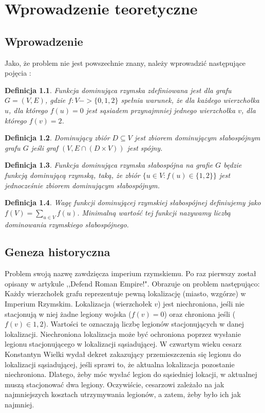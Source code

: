 \chapter{Wprowadzenie teoretyczne}

\section{Wprowadzenie}
Jako, że problem nie jest powszechnie znany, należy wprowadzić następujące pojęcia \cite{theoryWCRDF}:

\newtheorem{definition}{Definicja}

\begin{definition}
    Funkcja dominująca rzymska zdefiniowana jest dla grafu $G = (V, E)$, gdzie $f: V -> \{0,1,2\}$ spełnia warunek, że dla każdego wierzchołka $u$, dla którego $f(u) = 0$ jest sąsiadem przynajmniej jednego wierzchołka $v$, dla którego $f(v) = 2$.
\end{definition}

\begin{definition}
    Dominujący zbiór $D \subseteq V$ jest zbiorem dominującym słabospójnym grafu $G$ jeśli graf $(V,E \cap (D \times V))$ jest spójny.
\end{definition}

\begin{definition}
    Funkcja dominująca rzymska słabospójna na grafie $G$ będzie funkcją dominującą rzymską, taką, że zbiór $\{u \in V: f(u) \in \{1,2\}\}$ jest jednocześnie zbiorem dominującym słabospójnym.
\end{definition}

\begin{definition}
    Wagę funkcji dominującej rzymskiej słabospójnej definiujemy jako $f(V) = \sum_{u \in V}{f(u)}$. Minimalną wartość tej funkcji nazywamy liczbą dominowania rzymskiego słabospójnego. 
\end{definition}

\section{Geneza historyczna}
Problem swoją nazwę zawdzięcza imperium rzymskiemu. Po raz pierwszy został opisany w artykule ,,Defend Roman Empire!".
Obrazuje on problem następująco: Każdy wierzchołek grafu reprezentuje pewną lokalizację (miasto, wzgórze) w Imperium Rzymskim. Lokalizacja (wierzchołek $v$) jest niechroniona, jeśli nie stacjonują w niej żadne legiony wojska ($f(v) = 0$) oraz chroniona jeśli ($f(v) \in {1,2} $). Wartości te oznaczają liczbę legionów stacjonujących w danej lokalizacji. Niechroniona lokalizacja może być ochroniona poprzez wysłanie legionu stacjonującego w lokalizacji sąsiadującej. W czwartym wieku cesarz Konstantyn Wielki wydał dekret zakazujący przemieszczenia się legionu do lokalizacji sąsiadującej, jeśli sprawi to, że aktualna lokalizacja pozostanie niechroniona. Dlatego, żeby móc wysłać legion do sąsiedniej lokacji, w aktualnej muszą stacjonować dwa legiony. Oczywiście, cesarzowi zależało na jak najmniejszych kosztach utrzymywania legionów, a zatem, żeby było ich jak najmniej. \cite{theoryWCRDF}

